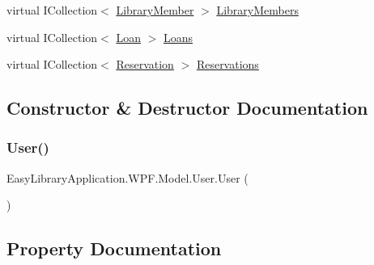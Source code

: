 \begin{DoxyCompactItemize}
\item 
virtual I\+Collection$<$ \mbox{\hyperlink{class_easy_library_application_1_1_w_p_f_1_1_model_1_1_library_member}{Library\+Member}} $>$ \mbox{\hyperlink{class_easy_library_application_1_1_w_p_f_1_1_model_1_1_user_a9dd5295b0910fc1e79880dd150a041f7}{Library\+Members}}
\item 
virtual I\+Collection$<$ \mbox{\hyperlink{class_easy_library_application_1_1_w_p_f_1_1_model_1_1_loan}{Loan}} $>$ \mbox{\hyperlink{class_easy_library_application_1_1_w_p_f_1_1_model_1_1_user_ad234e83d7bd7778f69495543a1762db9}{Loans}}
\item 
virtual I\+Collection$<$ \mbox{\hyperlink{class_easy_library_application_1_1_w_p_f_1_1_model_1_1_reservation}{Reservation}} $>$ \mbox{\hyperlink{class_easy_library_application_1_1_w_p_f_1_1_model_1_1_user_a1f043c136f86e527855297f76c7d83ff}{Reservations}}
\end{DoxyCompactItemize}


\subsection{Constructor \& Destructor Documentation}
\mbox{\label{class_easy_library_application_1_1_w_p_f_1_1_model_1_1_user_a5754ecf82cf8923703ed9621132cc1d5}} 
\subsubsection{\texorpdfstring{User()}{User()}}
{\footnotesize\ttfamily Easy\+Library\+Application.\+W\+P\+F.\+Model.\+User.\+User (\begin{DoxyParamCaption}{ }\end{DoxyParamCaption})}



\subsection{Property Documentation}
\mbox{\label{class_easy_library_application_1_1_w_p_f_1_1_model_1_1_user_a074be662dc39c0cf1a77d5ad693e480d}} 
